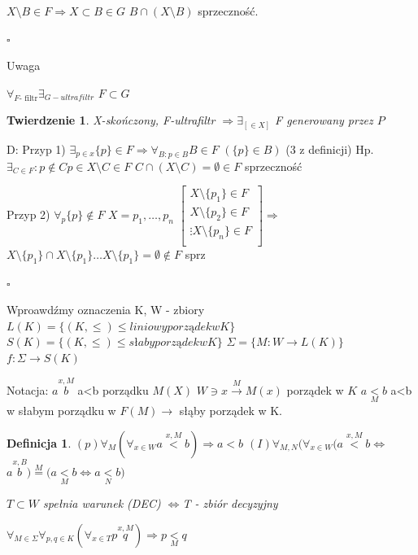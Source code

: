 \documentclass[12pt,a4paper]{article}
\theoremstyle{break}
\newtheorem{definition}{Definicja}[section]
\newtheorem{theorem}{Twierdzenie}[section]
\newcommand{\witw}{$\Leftrightarrow$}
\begin{document}
	$X\setminus B \in F \Rightarrow X\subset B \in G$ $B \cap (X\setminus B)$ sprzeczność.
	
	\begin{flushright}$\square$\end{flushright}
	
	Uwaga
	
	$\forall_{F \text{- filtr}} \exists_{G-ultrafiltr}$ $F\subset G$ 
	
	\begin{theorem}
		X-skończony, F-ultrafiltr $\Rightarrow \exists_{[\in X]}$ F generowany przez $P$ 
	\end{theorem}
	
	D:
	Przyp 1) $\exists_{p\in x} \{p\} \in F \Rightarrow \forall_{B : p\in B} B\in F$ $(\{p\}\in B) $ (3 z definicji)
	Hp. $\exists_{C\in F}:p\notin C p\in X\setminus C \in F$
	$C \cap (X\setminus C)=\emptyset \in F$ sprzeczność
	
	Przyp 2) $\forall_p \{p\}\notin F$
	$X={p_1,\dots,p_n}$
	$\begin{bmatrix}
		X\setminus\{p_1\}\in F\\
		X\setminus\{p_2\}\in F\\
		\vdots
		X\setminus\{p_n\}\in F\\
	\end{bmatrix}\Rightarrow $
	$X\setminus\{p_1\} \cap X\setminus\{p_1\} \dots X\setminus\{p_1\} = \emptyset \notin F$ sprz
	\begin{flushright}$\square$\end{flushright}
	
	Wproawdźmy oznaczenia
		K, W - zbiory
		$L(K)= \{ (K,\leq) \leq liniowy porządek w K\}$
		$S(K) = \{ (K,\leq) \leq słaby porządek w K\}$
		$\Sigma = \{ M: W \rightarrow L(K)\}$
		$f:\Sigma \rightarrow S(K)$
		
		Notacja:
		$a\overset{x,M}{b}$ a<b porządku $M(X)$
		$W\ni x \overset{M}{\rightarrow} M(x)$ porządek w $K$
		$a\underset{M}{<}b$ a<b w słabym porządku w $F(M) \rightarrow$ słąby porządek w K.
		
		
		
	\begin{definition}
		$(p) \forall_M (\forall_{x\in W} a\overset{x,M}{<}b)\Rightarrow a<b$
		$(I) \forall_{M,N} (\forall_{x\in W} (a\overset{x,M}{<}b$\witw$a\overset{x,B}{b})\overset{M}{=}(a\underset{M}{<}b$\witw$a\underset{N}{<}b)$
		
		$T\subset W$ spełnia warunek (DEC) \witw T - zbiór decyzyjny
		
		$\forall_{M\in \Sigma} \forall_{p,q \in K} (\forall_{x\in T} p\overset{x,M}{q}) \Rightarrow p\underset{M}{<}q$
		
	\end{definition}
	
\end{document}
